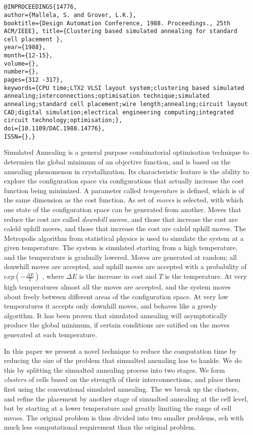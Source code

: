 \documentclass[pdftex,11pt]{article}
\begin{document}
\section*{}
\begin{verbatim}
@INPROCEEDINGS{14776, 
author={Mallela, S. and Grover, L.K.}, 
booktitle={Design Automation Conference, 1988. Proceedings., 25th ACM/IEEE}, title={Clustering based simulated annealing for standard cell placement }, 
year={1988}, 
month={12-15}, 
volume={}, 
number={}, 
pages={312 -317}, 
keywords={CPU time;LTX2 VLSI layout system;clustering based simulated annealing;interconnections;optimisation technique;simulated annealing;standard cell placement;wire length;annealing;circuit layout CAD;digital simulation;electrical engineering computing;integrated circuit technology;optimisation;}, 
doi={10.1109/DAC.1988.14776}, 
ISSN={},}
\end{verbatim}

Simulated Annealing is a general purpose combinatorial optimisation technique to determien the global minimum of an objective function, and is based on the annealing phenomenon in crystallization. Its characteristic feature is the ability to explore the configuration space via configurations that actually increase the cost function being minimized. A parameter called \emph{temperature} is defined, which is of the same dimension as the cost function. As set of \emph{moves} is selected, with which one state of the configuration space can be generated from another. Moves that reduce the cost are called \emph{downhill} moves, and those that increase the cost are caleld uphill moves, and those that increase the cost are caleld uphill moves. The Metropolis algorithm from statistical physics is used to simulate the system at a given temperature. The system is simulated starting from a high temperature, and the temperature is gradually lowered. Moves are generated at random; all donwhill moves are accepted, and uphill moves are accepted with a probability of $exp(-\frac{\Delta E}{T})$ , where $\Delta E$ is the increase in cost and $T$ is the temperature. At very high temperatures almost all the moves are accepted, and the system moves about freely between different areas of the configuration space. At very low temperatures it accepts only downhill moves, and behaves like a greedy algorithm. It has been proven that simulated annealing will asymptotically produce the global minimum, if certain conditions are satified on the moves generated at each temperature.

In this paper we present a novel technique to reduce the computation time by reducing the size of the problem that simualted anenaling has to hanlde. We do this by splitting the simualted annealing process into two stages. We form \emph{clusters} of cells based on the strength of their interconnections, and place them first using the conventional simulated annealing. The we break up the clusters, and refine the placement by another stage of simualted annealing at the cell level, but by starting at a lower temperature and greatly limiting the range of cell mvoes. The original problem is thus divided into two smaller problems, ech with much less computational requirement than the original problem.
\end{document}
